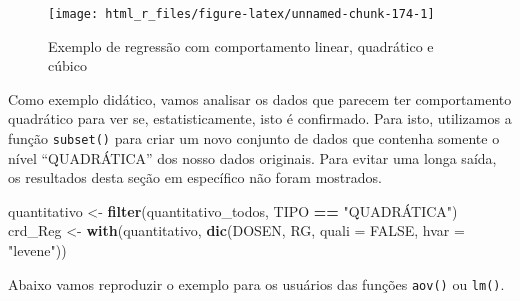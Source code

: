 \documentclass[
]{book}
\newenvironment{Shaded}{\begin{snugshade}}{\end{snugshade}}
\newcommand{\DataTypeTok}[1]{\textcolor[rgb]{0.13,0.29,0.53}{#1}}
\newcommand{\KeywordTok}[1]{\textcolor[rgb]{0.13,0.29,0.53}{\textbf{#1}}}
\newcommand{\NormalTok}[1]{#1}
\newcommand{\OperatorTok}[1]{\textcolor[rgb]{0.81,0.36,0.00}{\textbf{#1}}}
\newcommand{\OtherTok}[1]{\textcolor[rgb]{0.56,0.35,0.01}{#1}}
\newcommand{\StringTok}[1]{\textcolor[rgb]{0.31,0.60,0.02}{#1}}
\begin{document}
\begin{figure}

{\centering \texttt{[image: html\_r\_files/figure-latex/unnamed-chunk-174-1]} 

}

\caption{Exemplo de regressão com comportamento linear, quadrático e cúbico}\label{fig:unnamed-chunk-174}
\end{figure}

Como exemplo didático, vamos analisar os dados que parecem ter comportamento quadrático para ver se, estatisticamente, isto é confirmado. Para isto, utilizamos a função \texttt{subset()}  para criar um novo conjunto de dados que contenha somente o nível ``QUADRÁTICA'' dos nosso dados originais. Para evitar uma longa saída, os resultados desta seção em específico não foram mostrados.

\begin{Shaded}
\begin{Highlighting}[]
\NormalTok{quantitativo <-}\StringTok{ }\KeywordTok{filter}\NormalTok{(quantitativo_todos, TIPO  }\OperatorTok{==}\StringTok{  "QUADRÁTICA"}\NormalTok{)}
\NormalTok{crd_Reg <-}\StringTok{ }\KeywordTok{with}\NormalTok{(quantitativo, }\KeywordTok{dic}\NormalTok{(DOSEN, RG, }\DataTypeTok{quali =} \OtherTok{FALSE}\NormalTok{, }\DataTypeTok{hvar =} \StringTok{"levene"}\NormalTok{))}
\end{Highlighting}
\end{Shaded}

Abaixo vamos reproduzir o exemplo para os usuários das funções \texttt{aov()} ou \texttt{lm()}.
 
\end{document}
